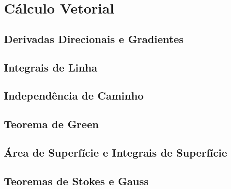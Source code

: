 \chapter{Cálculo Vetorial}
\label{chp:vectorcalculus}

\section{Derivadas Direcionais e Gradientes}
\label{sec:directionaldiff}

\section{Integrais de Linha}
\label{sec:lineint}

\section{Independência de Caminho}
\label{sec:independencepath}

\section{Teorema de Green}
\label{sec:greentheorem}

\section{Área de Superfície e Integrais de Superfície}
\label{sec:surfacearea}

\section{Teoremas de Stokes e Gauss}
\label{sec:stokesgauss}

\begin{chapterproblems}
\end{chapterproblems}
